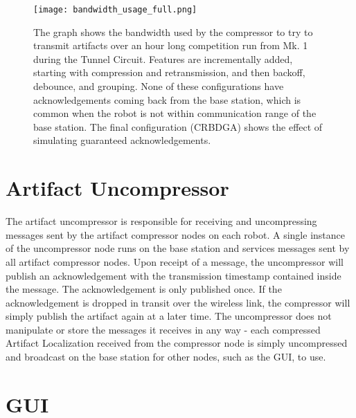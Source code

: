 \begin{figure}	
	
	\centering		
	\texttt{[image: bandwidth\_usage\_full.png]}
	\caption[Artifact transmission bandwidth usage]{The graph shows the bandwidth used by the compressor to try to transmit artifacts over an hour long competition run from Mk. 1 during the Tunnel Circuit. Features are incrementally added, starting with compression and retransmission, and then backoff, debounce, and grouping. None of these configurations have acknowledgements coming back from the base station, which is common when the robot is not within communication range of the base station. The final configuration (CRBDGA) shows the effect of simulating guaranteed acknowledgements.}
	\label{bandwidth_usage}
\end{figure}


\section{Artifact Uncompressor}

The artifact uncompressor is responsible for receiving and uncompressing messages sent by the artifact compressor nodes on each robot. A single instance of the uncompressor node runs on the base station and services messages sent by all artifact compressor nodes. Upon receipt of a message, the uncompressor will publish an acknowledgement with the transmission timestamp contained inside the message. The acknowledgement is only published once. If the acknowledgement is dropped in transit over the wireless link, the compressor will simply publish the artifact again at a later time. The uncompressor does not manipulate or store the messages it receives in any way - each compressed Artifact Localization received from the compressor node is simply uncompressed and broadcast on the base station for other nodes, such as the GUI, to use.

\section{GUI}

